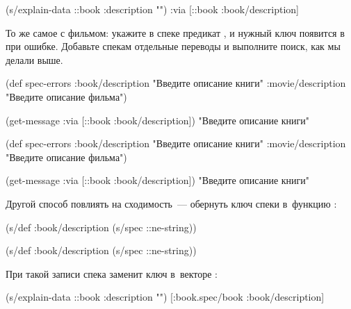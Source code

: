 \else

\begin{clojure}
(s/explain-data ::book {:description ""})
{:via [::book :book/description]}
\end{clojure}

\fi

То же самое с фильмом: укажите в спеке  предикат
, и нужный ключ появится в  при ошибке. Добавьте
спекам отдельные переводы и выполните поиск, как мы делали выше.

\pagebreaklarge

\ifnarrow

\begin{clojure}
(def spec-errors
  {:book/description
   "Введите описание книги"
   :movie/description
   "Введите описание фильма"})

(get-message
  {:via [::book :book/description]})
"Введите описание книги"
\end{clojure}

\else

\begin{clojure}
(def spec-errors
  {:book/description "Введите описание книги"
   :movie/description "Введите описание фильма"})

(get-message {:via [::book :book/description]})
"Введите описание книги"
\end{clojure}

\fi

Другой способ повлиять на сходимость~--- обернуть ключ спеки в~функцию
:

\ifnarrow

\begin{clojure}
(s/def :book/description
  (s/spec ::ne-string))
\end{clojure}

\else

\begin{clojure}
(s/def :book/description (s/spec ::ne-string))
\end{clojure}

\fi

При такой записи спека  заменит ключ 
в~векторе :

\ifnarrow

\begin{clojure}
(s/explain-data ::book
  {:description ""})
[:book.spec/book :book/description]
\end{clojure}

